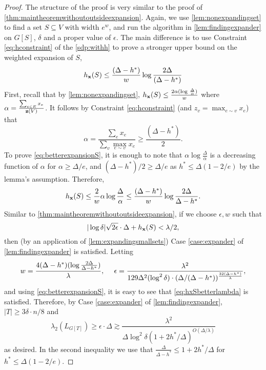 \documentclass[11pt]{article}
\def\bx{{\bf x}}
\def\bz{{\bf z}}
\def\eps{\epsilon}
\def\h{h}
\begin{document}
\thmmainnoexp*
\begin{proof}The structure of the proof is very similar to the proof of  
\autoref{thm:maintheoremwithoutoutsideexpansion}. Again, we use  
\autoref{lem:nonexpandingset} to find a set $S \subseteq V$ with 
width $e^w$, and run the algorithm in \autoref{lem:findingexpander} on  $G[S]$, $\delta$ and a proper value of 
$\epsilon$. The main 
difference  is to use Constraint \eqref{eq:hconstraint} of 
the \ref{sdp:withh} to prove a stronger upper bound on the weighted expansion of $S$, 
\begin{equation}\label{eq:betterexpansionS}h_\bx(S)\leq \frac{(\Delta-h^*)}{w}\log \frac{2\Delta}{(\Delta-h^*)}	
\end{equation}
First, recall that by \autoref{lem:nonexpandingset}, $h_\bx(S) 
\leq \frac{2\alpha(\log \, \frac{\Delta}{\alpha})}{w}$
where $\alpha =\frac{\sum_{e \in E} x_e}{\bz(V)}$.
It follows by Constraint \eqref{eq:hconstraint} (and  $z_v=\max_{e\sim v} x_e$) that 
$$\alpha=\frac{\sum_e x_e}{\sum_v \max_{e\sim v} x_e}\geq \frac{(\Delta-h^*)}{2}.$$
To prove \eqref{eq:betterexpansionS}, it is enough to note that $\alpha\log\frac{\Delta}{\alpha}$ is a decreasing function of $\alpha$ for $\alpha\geq \Delta/e$, and $(\Delta-h^*)/2\geq \Delta/e$ as $h^*\leq \Delta(1-2/e)$ by the lemma's assumption. Therefore, 
$$ h_\bx(S) \leq \frac2w\alpha\log\frac{\Delta}{\alpha} \leq \frac{(\Delta-h^*)}{w}\log\frac{2\Delta}{\Delta-h^*}.$$
Similar to \autoref{thm:maintheoremwithoutoutsideexpansion}, if we choose $\eps,w$ such that 
\begin{equation}\label{eq:hxSbetterlambda}|\log\delta|\sqrt{2\eps}\cdot\Delta+h_\bx(S) 
<\lambda/2,	
\end{equation}
then (by an application of \autoref{lem:expandingsmallsets}) Case \ref{case:expander} of \autoref{lem:findingexpander} is satisfied.
Letting $$w= \frac{ 4(\Delta-h^*)(\log \frac{2\Delta}{\Delta-
h^*})}{\lambda}, \hspace{3ex} \epsilon =\frac{{\lambda}^2}
{129\Delta^2(\log^2 \delta)\cdot (\Delta/(\Delta-
h^*))^{\frac{32(\Delta-h^*)}
{\lambda}}},$$  
and using \eqref{eq:betterexpansionS}, it is easy to see that \eqref{eq:hxSbetterlambda} is satisfied. 
Therefore, by Case \ref{case:expander} of \autoref{lem:findingexpander}, $|T|\geq 3\delta \cdot n /8$ and 
$$\lambda_2(L_{G[T]}) \geq \eps\cdot\Delta\gtrsim \frac{\lambda^2}{\Delta\log^2\delta(1+2h^*/\Delta)^{O(\Delta/\lambda)}}$$
as desired. In the second inequality we use that $\frac{\Delta}{\Delta-h^*}\leq 1+2h^*/\Delta$ for $\h^*\leq\Delta(1-2/e)$.
\end{proof}
\end{document}
